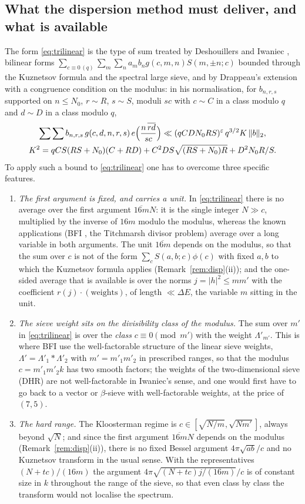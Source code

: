 \documentclass[11pt]{amsart}
\theoremstyle{remark}
\newcommand{\e}{\varepsilon}
\begin{document}
\subsection{What the dispersion method must deliver, and what is available}\label{subsec:deliver}
The form \eqref{eq:trilinear} is the type of sum treated by Deshouillers and Iwaniec \cite[Theorems~9--12]{DI}, bilinear forms $\sum_{c\equiv0\,(q)}\sum_m\sum_na_mb_ng(c,m,n)S(m,\pm n;c)$ bounded through the Kuznetsov formula and the spectral large sieve, and by Drappeau's extension \cite[Theorem~2.1]{Drappeau} with a congruence condition on the modulus: in his normalisation, for $b_{n,r,s}$ supported on $n\le N_0$, $r\sim R$, $s\sim S$, moduli $sc$ with $c\sim C$ in a class modulo $q$ and $d\sim D$ in a class modulo $q$,
\begin{gather*}
\sum\sum b_{n,r,s}\,g(c,d,n,r,s)\,e\Bigl(\frac{n\,\overline{rd}}{sc}\Bigr)\ll(qCDN_0RS)^{\e}\,q^{3/2}K\,\|b\|_2,\\
K^2=qCS(RS+N_0)(C+RD)+C^2DS\sqrt{(RS+N_0)R}+D^2N_0R/S .
\end{gather*}
To apply such a bound to \eqref{eq:trilinear} one has to overcome three specific features.
\begin{enumerate}[label=\textup{(\alph*)},leftmargin=2.2em]
\item \emph{The first argument is fixed, and carries a unit.} In \eqref{eq:trilinear} there is no average over the first argument $\overline{16m}N$: it is the single integer $N\gg c$, multiplied by the inverse of $16m$ modulo the modulus, whereas the known applications (BFI \cite{BFI}, the Titchmarsh divisor problem) average over a long variable in both arguments. The unit $\overline{16m}$ depends on the modulus, so that the sum over $c$ is not of the form $\sum_cS(a,b;c)\phi(c)$ with fixed $a,b$ to which the Kuznetsov formula applies (Remark~\ref{rem:disp}(ii)); and the one-sided average that is available is over the norms $j=|h|^2\le mm'$ with the coefficient $r(j)\cdot(\text{weights})$, of length $\ll\Delta E$, the variable $m$ sitting in the unit.
\item \emph{The sieve weight sits on the divisibility class of the modulus.} The sum over $m'$ in \eqref{eq:trilinear} is over the \emph{class} $c\equiv0\pmod{m'}$ with the weight $\Lambda'_{m'}$. This is where BFI use the well-factorable structure of the linear sieve weights, $\Lambda'=\Lambda'_1*\Lambda'_2$ with $m'=m'_1m'_2$ in prescribed ranges, so that the modulus $c=m'_1m'_2k$ has two smooth factors; the weights of the two-dimensional sieve (DHR) are not well-factorable in Iwaniec's sense, and one would first have to go back to a vector or $\beta$-sieve with well-factorable weights, at the price of $(7,5)$.
\item \emph{The hard range.} The Kloosterman regime is $c\in[\sqrt{N/m},\sqrt{Nm'}]$, always beyond $\sqrt N$; and since the first argument $\overline{16m}N$ depends on the modulus (Remark~\ref{rem:disp}(ii)), there is no fixed Bessel argument $4\pi\sqrt{ab}/c$ and no Kuznetsov transform in the usual sense. With the representatives $(N+tc)/(16m)$ the argument $4\pi\sqrt{(N+tc)j/(16m)}/c$ is of constant size in $k$ throughout the range of the sieve, so that even class by class the transform would not localise the spectrum.
\end{enumerate}
\end{document}
